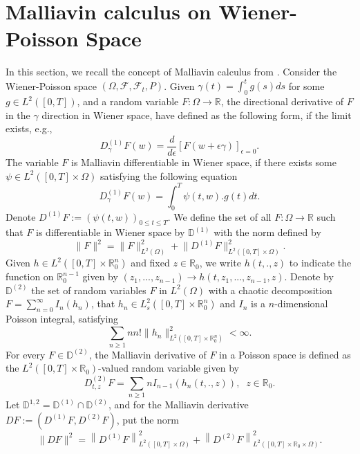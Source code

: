 \documentclass[11pt]{article}
\numberwithin{equation}{section}
\begin{document}

\section{Malliavin calculus on Wiener-Poisson Space}
In this section, we recall the concept of Malliavin calculus from \cite{nualart}. Consider the Wiener-Poisson space $(\Omega, \mathcal{F}, \mathcal{F}_t, P)$. 
Given $\gamma(t)=\int_{0}^{t}g(s)ds$ for some $g\in{L^{2}}(\left[0, T\right])$, and a random variable $F:\Omega\to{\mathbb{R}}$, the directional derivative of $F$ in the $\gamma$ direction in Wiener space, have defined as the following form, if the limit exists,  e.g.,
	\begin{equation*}
	D^{(1)}_\gamma{F}(w)=\frac{d}{d\epsilon}[F(w+\epsilon\gamma)]_{\epsilon=0}.
	\end{equation*}
The variable $F$ is Malliavin differentiable in Wiener space, if there exists some $\psi\in{L^{2}(\left[0,T\right]\times\Omega)}$ satisfying the following equation
	\begin{equation}
	\nonumber D^{(1)}_\gamma{F}(w)=\int_{0}^{T}\psi(t,w).g(t)dt.
	\end{equation}
Denote $D^{(1)} F:=(\psi(t,w))_{0\le{t}\le{T}}$. We define the set of all $F:\Omega\to\mathbb{R}$ such that $F$ is differentiable in Wiener space by $\mathbb{D}^{(1)}$ with the norm defined by 
\begin{equation*}\label{equ20}
\lVert{F}\rVert^2=\lVert{F}\rVert^2_{L^{2}(\Omega)}+\lVert{D^{(1)}{F}}\rVert^2_{L^{2}(\left[0, T\right]\times\Omega)}.
\end{equation*}
 Given $h\in L^{2}([0,T] \times \mathbb{R}_0^{n})$ and fixed $z\in \mathbb{R}_0$, we write $h(t,.,z)$ to indicate the function on $\mathbb{R}_0^{n-1}$ given by $(z_1,...,z_{n-1})\to h(t, z_1,...,z_{n-1}, z)$.
Denote by $\mathbb{D}^{(2)}$ the set of random variables $F$ in $L^{2}(\Omega)$ with a chaotic decomposition $F=\sum_{n=0}^{\infty}I_n(h_n)$, that $h_n\in L_s^{2}([0,T] \times \mathbb{R}_0^{n})$ and $I_n$ is a $n$-dimensional Poisson integral, satisfying
\begin{equation*}
	\nonumber \sum_{n\ge1}nn!\lVert{h_n}\rVert_{L^{2}([0,T] \times \mathbb{R}_0^{n})}^{2}<\infty.
\end{equation*}
For every $F\in \mathbb{D}^{(2)}$, the Malliavin derivative of $F$ in a Poisson space is defined as the $L^{2}([0,T] \times \mathbb{R}_0)$-valued random variable given by
\begin{equation*}
	\nonumber D_{t,z}^{(2)}F=\sum_{n\ge1}nI_{n-1}(h_n(t, .,z)),\;\;z\in \mathbb{R}_0.
\end{equation*}
Let $\mathbb{D}^{1,2}= \mathbb{D}^{(1)} \cap \mathbb{D}^{(2)}$, and for the Malliavin derivative $DF:=\left(D^{(1)} F, D^{(2)} F\right)$, put the norm 
$$
\|D F\|^{2}=\left\|D^{(1)} F\right\|_{L^{2}([0, T] \times \Omega)}^{2}+\left\|D^{(2)} F\right\|_{L^{2}([0, T] \times \mathbb{R}_0 \times \Omega)}^{2}.
$$
\end{document}
